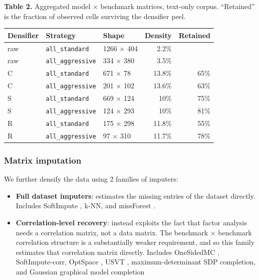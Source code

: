 \documentclass{article} %
\providecommand{\tightlist}{%
  \setlength{\itemsep}{0pt}\setlength{\parskip}{0pt}}
\begin{document}
\textbf{Table 2.} Aggregated model × benchmark matrices, text-only corpus. ``Retained'' is the fraction of observed cells surviving the densifier peel.

\begin{longtable}[]{@{}lllrr@{}}
\toprule\noalign{}
Densifier & Strategy & Shape & Density & Retained \\
\midrule\noalign{}
\endhead
\bottomrule\noalign{}
\endlastfoot
raw & \texttt{all\_standard} & 1266 × 404 & 2.2\% & \\
raw & \texttt{all\_aggressive} & 334 × 380 & 3.5\% & \\
C & \texttt{all\_standard} & 671 × 78 & 13.8\% & 65\% \\
C & \texttt{all\_aggressive} & 201 × 102 & 13.6\% & 63\% \\
S & \texttt{all\_standard} & 669 × 124 & 10\% & 75\% \\
S & \texttt{all\_aggressive} & 124 × 293 & 10\% & 81\% \\
R & \texttt{all\_standard} & 175 × 298 & 11.8\% & 55\% \\
R & \texttt{all\_aggressive} & 97 × 310 & 11.7\% & 78\% \\
\end{longtable}

\hypertarget{matrix-imputation}{%
\subsubsection{Matrix imputation}\label{matrix-imputation}}

We further densify the data using 2 families of imputers:

\begin{itemize}
\tightlist
\item
  \textbf{Full dataset imputers}: estimates the missing entries of the dataset directly. Includes SoftImpute \citep{mazumder2010}, k-NN, and missForest \citep{stekhoven2012}.
\item
  \textbf{Correlation-level recovery}: instead exploits the fact that factor analysis needs a correlation matrix, not a data matrix. The benchmark × benchmark correlation structure is a substantially
  weaker requirement, and so this family estimates that correlation matrix directly. Includes OneSidedMC \citep{cao2023}, SoftImpute-corr, OptSpace \citep{keshavan2010}, USVT \citep{chatterjee2015},
  maximum-determinant SDP completion, and Gaussian graphical model completion
\end{itemize}
\end{document}
